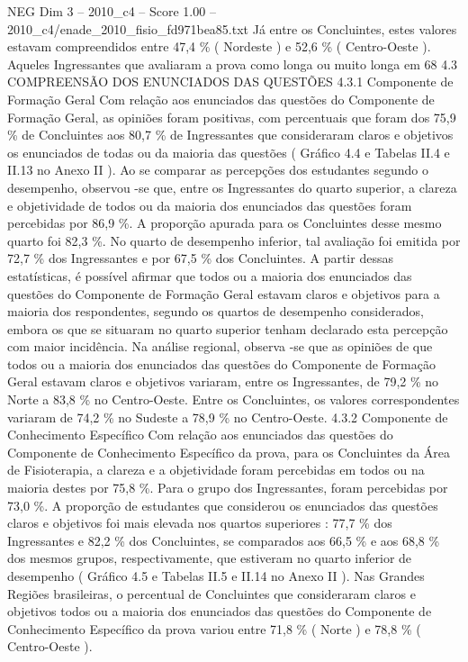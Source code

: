 \begin{textsample}{NEG Dim 3 – 2010\_c4 – Score 1.00 – 2010\_c4/enade\_2010\_fisio\_fd971bea85.txt}
Já entre os Concluintes, estes valores estavam compreendidos entre 47,4 \% ( Nordeste ) e 52,6 \% ( Centro-Oeste ).
Aqueles Ingressantes que avaliaram a prova como longa ou muito longa em 68 4.3 COMPREENSÃO DOS ENUNCIADOS DAS QUESTÕES 4.3.1 Componente de Formação Geral Com relação aos enunciados das questões do Componente de Formação Geral, as opiniões foram positivas, com percentuais que foram dos 75,9 \% de Concluintes aos 80,7 \% de Ingressantes que consideraram claros e objetivos os enunciados de todas ou da maioria das questões ( Gráfico 4.4 e Tabelas II.4 e II.13 no Anexo II ).
Ao se comparar as percepções dos estudantes segundo o desempenho, observou -se que, entre os Ingressantes do quarto superior, a clareza e objetividade de todos ou da maioria dos enunciados das questões foram percebidas por 86,9 \%.
A proporção apurada para os Concluintes desse mesmo quarto foi 82,3 \%.
No quarto de desempenho inferior, tal avaliação foi emitida por 72,7 \% dos Ingressantes e por 67,5 \% dos Concluintes.
A partir dessas estatísticas, é possível afirmar que todos ou a maioria dos enunciados das questões do Componente de Formação Geral estavam claros e objetivos para a maioria dos respondentes, segundo os quartos de desempenho considerados, embora os que se situaram no quarto superior tenham declarado esta percepção com maior incidência.
Na análise regional, observa -se que as opiniões de que todos ou a maioria dos enunciados das questões do Componente de Formação Geral estavam claros e objetivos variaram, entre os Ingressantes, de 79,2 \% no Norte a 83,8 \% no Centro-Oeste.
Entre os Concluintes, os valores correspondentes variaram de 74,2 \% no Sudeste a 78,9 \% no Centro-Oeste. 4.3.2 Componente de Conhecimento Específico Com relação aos enunciados das questões do Componente de Conhecimento Específico da prova, para os Concluintes da Área de Fisioterapia, a clareza e a objetividade foram percebidas em todos ou na maioria destes por 75,8 \%.
Para o grupo dos Ingressantes, foram percebidas por 73,0 \%.
A proporção de estudantes que considerou os enunciados das questões claros e objetivos foi mais elevada nos quartos superiores : 77,7 \% dos Ingressantes e 82,2 \% dos Concluintes, se comparados aos 66,5 \% e aos 68,8 \% dos mesmos grupos, respectivamente, que estiveram no quarto inferior de desempenho ( Gráfico 4.5 e Tabelas II.5 e II.14 no Anexo II ).
Nas Grandes Regiões brasileiras, o percentual de Concluintes que consideraram claros e objetivos todos ou a maioria dos enunciados das questões do Componente de Conhecimento Específico da prova variou entre 71,8 \% ( Norte ) e 78,8 \% ( Centro-Oeste ).

\end{textsample}
